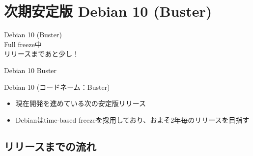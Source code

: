 
\section{次期安定版 Debian 10 (Buster)}

\begin{frame}
  \begin{center}\Huge{Debian 10 (Buster)\\Full freeze中\\リリースまであと少し！}\end{center}
\end{frame}


\begin{frame}{Debian 10 Buster}%

Debian 10 (コードネーム：Buster)

\begin{itemize}
\item 現在開発を進めている次の安定版リリース
\item Debianはtime-based freezeを採用しており、およそ2年毎のリリースを目指す
\end{itemize}
  \begin{center}
  \end{center}
\end{frame}


\subsection{リリースまでの流れ}

